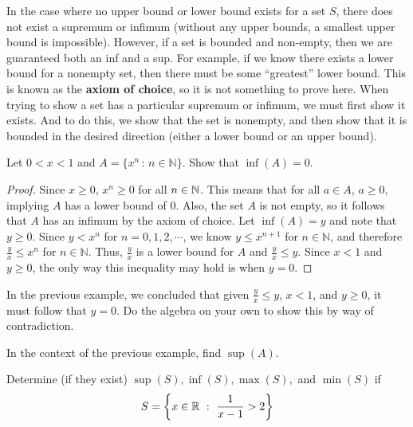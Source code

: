 In the case where no upper bound or lower bound exists for a set $S$, there does not exist a supremum or infimum (without any upper bounds, a smallest upper bound is impossible). However, if a set is bounded and non-empty, then we are guaranteed both an inf and a sup. For example, if we know there exists a lower bound for a nonempty set, then there must be some ``greatest'' lower bound. This is known as the \textbf{axiom of choice}, so it is not something to prove here. When trying to show a set has a particular supremum or infimum, we must first show it exists. And to do this, we show that the set is nonempty, and then show that it is bounded in the desired direction (either a lower bound or an upper bound). \par

\begin{example}
    Let $0<x<1$ and $A=\{x^n\, :\, n\in\mathbb{N}\}$. Show that $\inf(A)=0$.\par

    \begin{proof}
        Since $x\geq 0$, $x^n\geq 0$ for all $n\in\mathbb{N}$. This means that for all $a\in A$, $a\geq 0$, implying $A$ has a lower bound of 0. Also, the set $A$ is not empty, so it follows that $A$ has an infimum by the axiom of choice. Let $\inf(A)=y$ and note that $y\geq 0$. Since $y<x^n$ for $n=0,1,2,\cdots$, we know $y\leq x^{n+1}$ for $n\in\mathbb{N}$, and therefore $\frac{y}{x}\leq x^n$ for $n\in\mathbb{N}$. Thus, $\frac{y}{x}$ is a lower bound for $A$ and $\frac{y}{x}\leq y$. Since $x<1$ and $y\geq 0$, the only way this inequality may hold is when $y=0$.
    \end{proof}
\end{example}

\begin{exercise}
    In the previous example, we concluded that given $\frac{y}{x}\leq y$, $x<1$, and $y\geq 0$, it must follow that $y=0$. Do the algebra on your own to show this by way of contradiction.
\end{exercise}
    \vspace{-3mm}
\begin{exercise}
    In the context of the previous example, find $\sup(A)$. 
\end{exercise}
    \vspace{-3mm}
\begin{exercise}
    Determine (if they exist)  $\sup(S),\inf(S),\max(S),$ and $\min(S)$ if \[S=\left\{x\in\R\ : \ \frac{1}{x-1}>2\right\}\]
\end{exercise}

